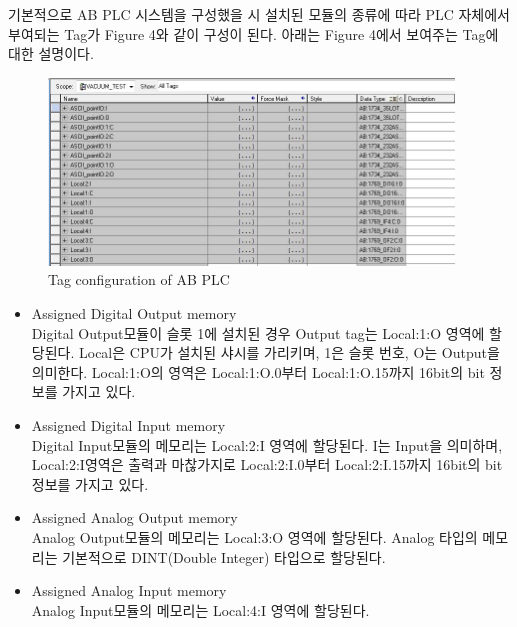 \documentclass[11pt
  , a4paper
  , article
  , oneside
]{memoir}
\begin{document}
 기본적으로 AB PLC 시스템을 구성했을 시 설치된 모듈의 종류에 따라 PLC 자체에서 부여되는 Tag가 Figure 4와 같이 구성이 된다. 아래는 Figure 4에서 보여주는 Tag에 대한 설명이다.  
  
\begin{figure}[!htb]
	\centering
	\includegraphics[width=0.96\textwidth]{./picture/tag_local.JPG}
	\caption{
		Tag configuration of AB PLC
	}
	\label{fig:}
\end{figure}  
  
\begin{itemize}
\item Assigned Digital Output memory\\
Digital Output모듈이 슬롯 1에 설치된 경우 Output tag는 Local:1:O 영역에 할당된다. Local은 CPU가 설치된 샤시를 가리키며, 1은 슬롯 번호, O는 Output을 의미한다. Local:1:O의 영역은 Local:1:O.0부터 Local:1:O.15까지 16bit의 bit 정보를 가지고 있다. 
\end{itemize}

\begin{itemize}
\item Assigned Digital Input memory\\
Digital Input모듈의 메모리는 Local:2:I 영역에 할당된다. I는 Input을 의미하며, Local:2:I영역은 출력과 마찮가지로 Local:2:I.0부터 Local:2:I.15까지 16bit의 bit 정보를 가지고 있다. 
\end{itemize}

\begin{itemize}
	\item Assigned Analog Output memory\\
	Analog Output모듈의 메모리는 Local:3:O 영역에 할당된다. Analog 타입의 메모리는 기본적으로 DINT(Double Integer) 타입으로 할당된다. 
\end{itemize}


\begin{itemize}
	\item Assigned Analog Input memory\\
	Analog Input모듈의 메모리는 Local:4:I 영역에 할당된다.
\end{itemize}
\end{document}
